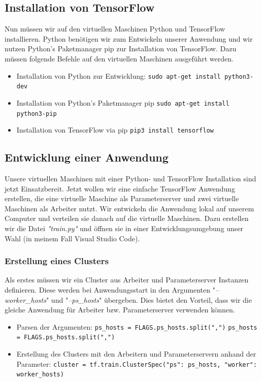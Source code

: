 \subsection{Installation von TensorFlow}
Nun müssen wir auf den virtuellen Maschinen Python und TensorFlow installieren. Python benötigen wir zum Entwickeln unserer Anwendung und wir nutzen Python's Paketmanager pip zur Installation von TensorFlow. Dazu müssen folgende Befehle auf den virtuellen Maschinen ausgeführt werden.
\begin{itemize}
	\item Installation von Python zur Entwicklung:\newline
			\texttt{sudo apt-get install python3-dev}
	\item Installation von Python's Paketmanager pip\newline
			\texttt{sudo apt-get install python3-pip}
	\item Installation von TensorFlow via pip\newline
			\texttt{pip3 install tensorflow}
\end{itemize}

\subsection{Entwicklung einer Anwendung}
Unsere virtuellen Maschinen mit einer Python- und TensorFlow Installation sind jetzt Einsatzbereit. Jetzt wollen wir eine einfache TensorFlow Anwendung erstellen, die eine virtuelle Maschine als Parameterserver und zwei virtuelle Maschinen als Arbeiter nutzt. Wir entwickeln die Anwendung lokal auf unserem Computer und verteilen sie danach auf die virtuelle Maschinen. Dazu erstellen wir die Datei \textit{"train.py"} und öffnen sie in einer Entwicklungsumgebung unser Wahl (in meinem Fall Visual Studio Code). 

\vspace{2mm}
\subsubsection{Erstellung eines Clusters}
Als erstes müssen wir ein Cluster aus Arbeiter und Parameterserver Instanzen definieren. Diese werden bei Anwendungsstart in den Argumenten "\textit{--worker\_hosts}" und "\textit{--ps\_hosts}" übergeben. Dies bietet den Vorteil, dass wir die gleiche Anwendung für Arbeiter bzw. Parameterserver verwenden können.

\begin{itemize}
	\item Parsen der Argumenten: \newline
		\texttt{ps\_hosts = FLAGS.ps\_hosts.split(",")} \newline
		\texttt{ps\_hosts = FLAGS.ps\_hosts.split(",")}
	\item Erstellung des Clusters mit den Arbeitern und Parameterservern anhand der Parameter: \newline
			\texttt{cluster = tf.train.ClusterSpec({"ps": ps\_hosts, "worker": worker\_hosts})}
\end{itemize}

